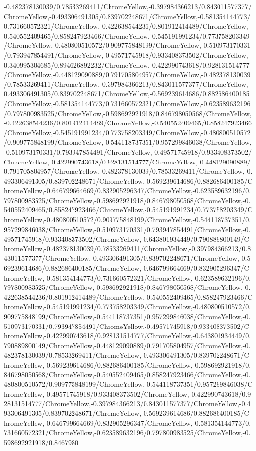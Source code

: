 {\begin{tikzternal}
{-0.482378130039/0.78533269411/ChromeYellow,-0.397984366213/0.843011577377/ChromeYellow,-0.493306491305/0.839702248671/ChromeYellow,-0.581354144773/0.731660572321/ChromeYellow,-0.422638544236/0.801912414489/ChromeYellow,-0.540552409465/0.858247923466/ChromeYellow,-0.545191991234/0.773758203349/ChromeYellow,-0.480800510572/0.909775848199/ChromeYellow,-0.510973170331/0.793947854491/ChromeYellow,-0.49571745918/0.933408373502/ChromeYellow,-0.340995304685/0.894626892232/ChromeYellow,-0.422990743618/0.928131514777/ChromeYellow,-0.448129090889/0.791705804957/ChromeYellow,-0.482378130039/0.78533269411/ChromeYellow,-0.397984366213/0.843011577377/ChromeYellow,-0.493306491305/0.839702248671/ChromeYellow,-0.569239614686/0.882686400185/ChromeYellow,-0.581354144773/0.731660572321/ChromeYellow,-0.623589632196/0.797800983525/ChromeYellow,-0.598692921918/0.846798050568/ChromeYellow,-0.422638544236/0.801912414489/ChromeYellow,-0.540552409465/0.858247923466/ChromeYellow,-0.545191991234/0.773758203349/ChromeYellow,-0.480800510572/0.909775848199/ChromeYellow,-0.544118737351/0.957299846038/ChromeYellow,-0.510973170331/0.793947854491/ChromeYellow,-0.49571745918/0.933408373502/ChromeYellow,-0.422990743618/0.928131514777/ChromeYellow,-0.448129090889/0.791705804957/ChromeYellow,-0.482378130039/0.78533269411/ChromeYellow,-0.493306491305/0.839702248671/ChromeYellow,-0.569239614686/0.882686400185/ChromeYellow,-0.646799664669/0.832905296347/ChromeYellow,-0.623589632196/0.797800983525/ChromeYellow,-0.598692921918/0.846798050568/ChromeYellow,-0.540552409465/0.858247923466/ChromeYellow,-0.545191991234/0.773758203349/ChromeYellow,-0.480800510572/0.909775848199/ChromeYellow,-0.544118737351/0.957299846038/ChromeYellow,-0.510973170331/0.793947854491/ChromeYellow,-0.49571745918/0.933408373502/ChromeYellow,-0.643801934449/0.790889800149/ChromeYellow,-0.482378130039/0.78533269411/ChromeYellow,-0.397984366213/0.843011577377/ChromeYellow,-0.493306491305/0.839702248671/ChromeYellow,-0.569239614686/0.882686400185/ChromeYellow,-0.646799664669/0.832905296347/ChromeYellow,-0.581354144773/0.731660572321/ChromeYellow,-0.623589632196/0.797800983525/ChromeYellow,-0.598692921918/0.846798050568/ChromeYellow,-0.422638544236/0.801912414489/ChromeYellow,-0.540552409465/0.858247923466/ChromeYellow,-0.545191991234/0.773758203349/ChromeYellow,-0.480800510572/0.909775848199/ChromeYellow,-0.544118737351/0.957299846038/ChromeYellow,-0.510973170331/0.793947854491/ChromeYellow,-0.49571745918/0.933408373502/ChromeYellow,-0.422990743618/0.928131514777/ChromeYellow,-0.643801934449/0.790889800149/ChromeYellow,-0.448129090889/0.791705804957/ChromeYellow,-0.482378130039/0.78533269411/ChromeYellow,-0.493306491305/0.839702248671/ChromeYellow,-0.569239614686/0.882686400185/ChromeYellow,-0.598692921918/0.846798050568/ChromeYellow,-0.540552409465/0.858247923466/ChromeYellow,-0.480800510572/0.909775848199/ChromeYellow,-0.544118737351/0.957299846038/ChromeYellow,-0.49571745918/0.933408373502/ChromeYellow,-0.422990743618/0.928131514777/ChromeYellow,-0.397984366213/0.843011577377/ChromeYellow,-0.493306491305/0.839702248671/ChromeYellow,-0.569239614686/0.882686400185/ChromeYellow,-0.646799664669/0.832905296347/ChromeYellow,-0.581354144773/0.731660572321/ChromeYellow,-0.623589632196/0.797800983525/ChromeYellow,-0.598692921918/0.8467980}
\end{tikzternal}}
